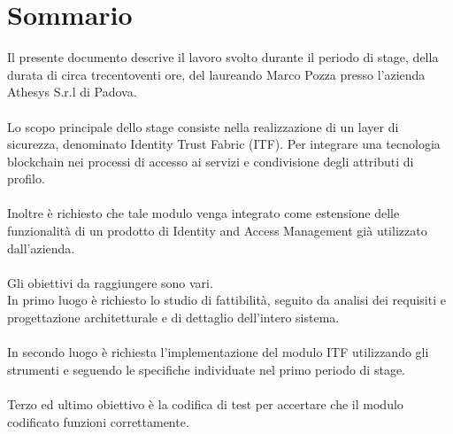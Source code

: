 
\cleardoublepage
{}
{}
\begingroup
\let\clearpage\relax
\let\cleardoublepage\relax
\let\cleardoublepage\relax

\chapter*{Sommario}

Il presente documento descrive il lavoro svolto durante il periodo di stage, della durata di circa trecentoventi ore, del laureando Marco Pozza presso l'azienda Athesys S.r.l di Padova.\\\\
Lo scopo principale dello stage consiste nella realizzazione di un layer di sicurezza, denominato Identity Trust Fabric (ITF). Per integrare una tecnologia blockchain nei processi di accesso ai servizi e condivisione degli attributi di profilo.\\\\
Inoltre è richiesto che tale modulo venga integrato come estensione delle funzionalità di un prodotto di Identity and Access Management già utilizzato dall'azienda.\\\\
Gli obiettivi da raggiungere sono vari.\\
In primo luogo è richiesto lo studio di fattibilità, seguito da analisi dei requisiti e progettazione architetturale e di dettaglio dell'intero sistema.\\\\
In secondo luogo è richiesta l'implementazione del modulo ITF utilizzando gli strumenti e seguendo le specifiche individuate nel primo periodo di stage.\\\\
Terzo ed ultimo obiettivo è la codifica di test per accertare che il modulo codificato funzioni correttamente.

%
%

\endgroup			

\vfill

